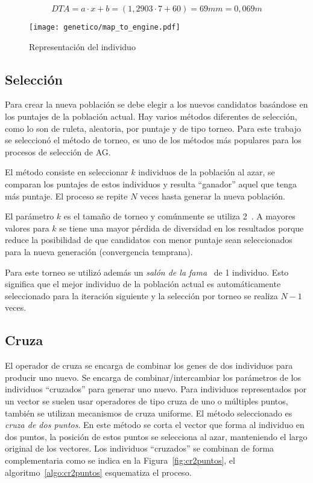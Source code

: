 \begin{equation*}
  DTA = a\cdot x + b = (1,2903\cdot 7 + 60) = 69 mm = 0,069 m
\end{equation*}


\begin{figure}[h!]
  \centering
  \texttt{[image: genetico/map\_to\_engine.pdf]}
  \caption{Representación del individuo}\label{fig:pop_bit}
\end{figure}


\subsection{Selección}

Para crear la nueva población se debe elegir a los nuevos candidatos basándose
en los puntajes de la población actual.
%
Hay varios métodos diferentes de selección, como lo son de ruleta, aleatoria,
por puntaje y de tipo torneo.
%
Para este trabajo se seleccionó el método de torneo, es uno de los métodos más
populares para los procesos de selección de AG.

El método consiste en seleccionar $k$ individuos de la población al azar, se
comparan los puntajes de estos individuos y resulta ``ganador'' aquel que tenga
más puntaje.
%
El proceso se repite $N$ veces hasta generar la nueva población.

El parámetro $k$ es el tamaño de torneo y comúnmente se utiliza
2~\parencite{oladele}.
%
A mayores valores para $k$ se tiene una mayor pérdida de diversidad en los
resultados\parencite{blickle} porque reduce la posibilidad de que candidatos con
menor puntaje sean seleccionados para la nueva generación (convergencia
temprana).

Para este torneo se utilizó además un \emph{salón de la
  fama}~\parencite{wirsansky} de 1 individuo.
%
Esto significa que el mejor individuo de la población actual es automáticamente
seleccionado para la iteración siguiente y la selección por torneo se realiza
$N-1$ veces.

\subsection{Cruza}
%
El operador de cruza se encarga de combinar los genes  de dos individuos para
producir uno nuevo.
%
Se encarga de combinar/intercambiar los parámetros de los individuos
``cruzados'' para generar uno nuevo.
%
Para individuos representados por un vector se suelen usar operadores de tipo
cruza de uno o múltiples puntos, también se utilizan mecanismos de cruza
uniforme.
%
El método seleccionado es \emph{cruza de dos puntos}.
%
En este método se corta el vector que forma al individuo en dos puntos, la
posición de estos puntos se selecciona al azar, manteniendo el largo original de
los vectores.
%
Los individuos ``cruzados'' se combinan de forma complementaria como se indica
en la Figura~\ref{fig:cr2puntos}, el algoritmo~\ref{algo:cr2puntos} esquematiza
el proceso.

